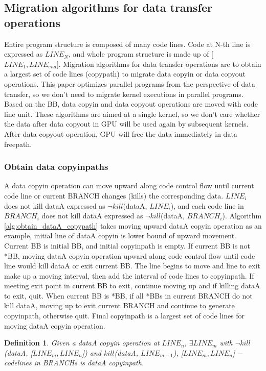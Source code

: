 \documentclass[10pt,conference]{IEEEtran}
\newtheorem{Def1}{Definition}
\begin{document}
\subsection{Migration algorithms for data transfer operations}
Entire program structure is composed of many code lines. Code at N-th line is expressed as $LINE_N$, and whole program structure is made up of [$LINE_1, LINE_{end}$]. Migration algorithms for data transfer operations are to obtain a largest set of code lines (copypath) to migrate data copyin or data copyout operations. This paper optimizes parallel programs from the perspective of data transfer, so we don't need to migrate kernel executions in parallel programs. Based on the BB, data copyin and data copyout operations are moved with code line unit. These algorithms are aimed at a single kernel, so we don't care whether the data after data copyout in GPU will be used again by subsequent kernels. After data copyout operation, GPU will free the data immediately in data freepath.



\subsubsection{Obtain data copyinpaths}
A data copyin operation can move upward along code control flow until current code line or current BRANCH changes (kills) the corresponding data. $LINE_i$ does not kill dataA expressed as  $\neg$$kill$(dataA, $LINE_i$), and each code line in $BRANCH_i$ does not kill dataA expressed as $\neg$$kill$(dataA, $BRANCH_i$). Algorithm \ref{alg:obtain_dataA_copypath} takes moving upward dataA copyin operation as an example, initial line of dataA copyin is lower bound of upward movement. Current BB is initial BB, and initial copyinpath is empty. If current BB is not *BB, moving dataA copyin operation upward along code control flow until code line would kill dataA or exit current BB. The line begins to move and line to exit make up a moving interval, then add the interval of code lines to copyinpath. If meeting exit point in current BB to exit, continue moving up and if killing dataA to exit, quit. When current BB is *BB, if all *BBs in current BRANCH do not kill dataA, moving up to exit current BRANCH and continue to generate copyinpath, otherwise quit. Final copyinpath is a largest set of code lines for moving dataA copyin operation.
\begin{Def1}
Given a dataA copyin operation at $LINE_n$, $\exists$$LINE_m$ with $\neg$$kill$(dataA, [$LINE_m, LINE_n$]) and $kill$(dataA, $LINE_{m-1}$), [$LINE_m, LINE_n$] $-$ codelines in BRANCHs is dataA copyinpath.
\end{Def1}
\end{document}
